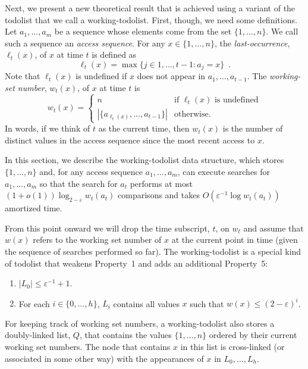 \documentclass{patmorin}
\newcommand{\eps}{\varepsilon}
\begin{document}
Next, we present a new theoretical result that is achieved using a
variant of the todolist that we call a working-todolist.  First, though, we need
some definitions.  Let $a_1,\ldots,a_m$ be a sequence whose elements come
from the set $\{1,\ldots,n\}$.  We call such a sequence an \emph{access
sequence}. For any $x\in\{1,\ldots,n\}$, the \emph{last-occurrence},
$\ell_t(x)$, of $x$ at time $t$ is defined as
\[
   \ell_t(x)=\max\{j\in{1,\ldots,t-1}: a_{j} = x\} \enspace .
\]
Note that $\ell_t(x)$ is undefined if $x$ does not appear in
$a_1,\ldots,a_{t-1}$.  The \emph{working-set number}, $w_t(x)$, of $x$
at time $t$ is
\[
    w_t(x) = \begin{cases}
               n & \text{if $\ell_t(x)$ is undefined} \\
               |\{a_{\ell_t(x)},\ldots,a_{t-1}\}| & \text{otherwise.}
             \end{cases}
\]
In words, if we think of $t$ as the current time, then $w_t(x)$ is the
number of distinct values in the access sequence since the most recent
access to $x$.

In this section, we describe the working-todolist data structure, which
stores $\{1,\ldots,n\}$ and, for any access sequence $a_1,\ldots,a_m$,
can execute searches for $a_1,\ldots,a_m$ so that the search for $a_t$
performs at most $(1+o(1))\log_{2-\eps} w_t(a_t)$ comparisons and takes
$O(\eps^{-1}\log w_t(a_t))$ amortized time.

From this point onward we will drop the time subscript, $t$, on $w_t$
and assume that $w(x)$ refers to the working set number of $x$ at the
current point in time (given the sequence of searches performed so far).
The working-todolist is a special kind of todolist that weakens Property~1
and adds an additional Property~5:

\begin{enumerate}
\item $|L_0|\le \eps^{-1}+1$.
\setcounter{enumi}{4}
\item For each $i\in\{0,\ldots,h\}$, $L_i$ contains all values $x$ such that $w(x)\le (2-\eps)^i$.
\end{enumerate}

For keeping track of working set numbers, a working-todolist also stores a
doubly-linked list, $Q$, that contains the values $\{1,\ldots,n\}$
ordered by their current working set numbers.  The node that contains $x$
in this list is cross-linked (or associated in some other way) with the
appearances of $x$ in $L_0,\ldots,L_h$.
\end{document}
